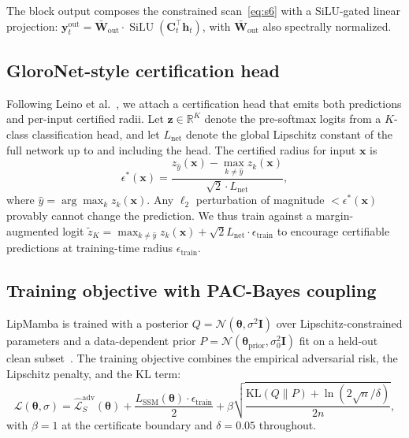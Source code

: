 \documentclass[12pt,a4paper]{article}
\theoremstyle{definition}
\theoremstyle{remark}
\newcommand{\modelname}{LipMamba}
\newcommand{\R}{\mathbb{R}}
\newcommand{\Lcal}{\mathcal{L}}
\newcommand{\Ncal}{\mathcal{N}}
\newcommand{\KL}{\mathrm{KL}}
\DeclareMathOperator{\SiLU}{SiLU}
\begin{document}
The block output composes the constrained scan~\eqref{eq:s6} with a SiLU-gated linear projection: $\mathbf{y}_t^{\mathrm{out}} = \bar{\mathbf{W}}_{\mathrm{out}} \cdot \SiLU(\mathbf{C}_t^\top \mathbf{h}_t)$, with $\bar{\mathbf{W}}_{\mathrm{out}}$ also spectrally normalized.

\subsection{GloroNet-style certification head}
\label{subsec:head}

Following Leino et al.~\cite{leino2021globally}, we attach a certification head that emits both predictions and per-input certified radii. Let $\bm{z} \in \R^K$ denote the pre-softmax logits from a $K$-class classification head, and let $L_{\mathrm{net}}$ denote the global Lipschitz constant of the full network up to and including the head. The certified radius for input $\mathbf{x}$ is
\begin{equation}
    \epsilon^*(\mathbf{x}) = \frac{z_{\hat{y}}(\mathbf{x}) - \max_{k \neq \hat{y}} z_k(\mathbf{x})}{\sqrt{2} \cdot L_{\mathrm{net}}},
    \label{eq:gloro}
\end{equation}
where $\hat{y} = \arg\max_k z_k(\mathbf{x})$. Any $\ell_2$ perturbation of magnitude $< \epsilon^*(\mathbf{x})$ provably cannot change the prediction. We thus train against a margin-augmented logit $\tilde{z}_K = \max_{k \neq \hat{y}} z_k(\mathbf{x}) + \sqrt{2} L_{\mathrm{net}} \cdot \epsilon_{\mathrm{train}}$ to encourage certifiable predictions at training-time radius $\epsilon_{\mathrm{train}}$.

\subsection{Training objective with PAC-Bayes coupling}
\label{subsec:training}

\modelname{} is trained with a posterior $Q = \Ncal(\bm{\theta}, \sigma^2 \mathbf{I})$ over Lipschitz-constrained parameters and a data-dependent prior $P = \Ncal(\bm{\theta}_{\mathrm{prior}}, \sigma_0^2 \mathbf{I})$ fit on a held-out clean subset~\cite{perezortiz2021tighter}. The training objective combines the empirical adversarial risk, the Lipschitz penalty, and the KL term:
\begin{equation}
    \Lcal(\bm{\theta}, \sigma) = \hat{\Lcal}_S^{\mathrm{adv}}(\bm{\theta}) + \frac{L_{\mathrm{SSM}}(\bm{\theta}) \cdot \epsilon_{\mathrm{train}}}{2} + \beta \sqrt{\frac{\KL(Q \| P) + \ln(2 \sqrt{n}/\delta)}{2 n}},
    \label{eq:objective}
\end{equation}
with $\beta = 1$ at the certificate boundary and $\delta = 0.05$ throughout.
\end{document}
